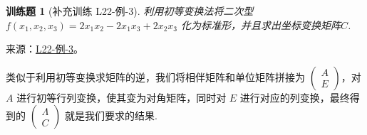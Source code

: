 \documentclass[12pt,fontset=fandol]{ctexart}
\newtheorem{exercise}{训练题}[section]
\begin{document}
\begin{exercise}[补充训练 L22-例-3]\label{prob:L22-例-3}
利用初等变换法将二次型 $f(x_1,x_2,x_3)=2x_1x_2-2x_1x_3+2x_2x_3$ 化为标准形，并且求出坐标变换矩阵$C$.
\end{exercise}
\noindent 来源：\href{https://github.com/yhwu-is/Linear-Algebra-Left-Undone/blob/new/%E8%AE%B2%E4%B9%89/%E4%B8%93%E9%A2%98/22%20%E4%BA%8C%E6%AC%A1%E5%9E%8B.tex}{L22-例-3}。
\begin{solve}
类似于利用初等变换求矩阵的逆，我们将相伴矩阵和单位矩阵拼接为 $\begin{pmatrix}
        A \\ E
    \end{pmatrix}$，对 $A$ 进行初等行列变换，使其变为对角矩阵，同时对 $E$ 进行对应的列变换，最终得到的 $\begin{pmatrix}
        \Lambda \\ C
    \end{pmatrix}$ 就是我们要求的结果.


\end{solve}
\end{document}
